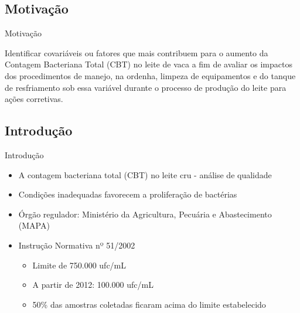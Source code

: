 \documentclass{beamer}
\begin{document}


\subsection{Motivação}
    \begin{frame}{Motivação}
        \begin{block}{}
            Identificar covariáveis ou fatores que mais contribuem para o aumento da Contagem Bacteriana 
            Total (CBT) no leite de vaca a fim de avaliar os impactos dos procedimentos de manejo, na 
            ordenha, limpeza de equipamentos e do tanque de resfriamento sob essa variável durante o 
            processo de produção do leite para ações corretivas.
        \end{block}
    \end{frame}

\subsection{Introdução}
    \begin{frame}{Introdução}
        \begin{itemize}
          \item A contagem bacteriana total (CBT) no leite cru - análise de qualidade        
          \item Condições inadequadas favorecem a proliferação de bactérias
          \item Órgão regulador: Ministério da Agricultura, Pecuária e Abastecimento (MAPA)
          \item Instrução Normativa nº 51/2002
            \begin{itemize}
              \item Limite de 750.000 ufc/mL
              \item A partir de 2012: 100.000 ufc/mL
              \item 50\% das amostras coletadas ficaram acima do limite estabelecido
            \end{itemize}
        \end{itemize}
    \end{frame}
\end{document}
